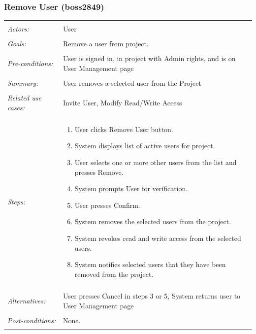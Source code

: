 \documentclass[11pt]{report}
\begin{document}
\subsubsection{Remove User  (boss2849)}
\begin{tabular}{ p{2cm} p{12cm} }
 \hline
 \\
 \textit{Actors:} & User \\ 
 \\
 \textit{Goals:} & Remove a user from project. \\
 \\
 \textit{Pre-conditions:} & User is signed in, in project with Admin rights, and is on User Management page\\
 \\
 \textit{Summary:} & User removes a selected user from the Project \\ 
 \\
 \textit{Related use cases:} & Invite User, Modify Read/Write Access \\ 
 \\
 \textit{Steps:} & \begin{enumerate}
  \item User clicks Remove User button.
  \item System displays list of active users for project.
  \item User selects one or more other users from the list and presses Remove.
  \item System prompts User for verification.
  \item User presses Confirm.
  \item System removes the selected users from the project.
  \item System revokes read and write access from the selected users.
  \item System notifies selected users that they have been removed from the project.
 \end{enumerate} \\
 \\
 \textit{Alternatives:} & User presses Cancel in steps 3 or 5, System returns user to User Management page \\
 \\
 \textit{Post-conditions:} & None. \\
 \\
\hline
\end{tabular}
\end{document}

